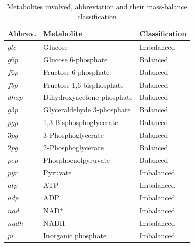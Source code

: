 \begin{table}[h]
\centering
\caption{Metabolites involved, abbreviation and  their mass-balance classification}
\label{tab: metabolites}
\begin{tabular}{lll}
\textbf{Abbrev.} & \textbf{Metabolite} & \textbf{Classification} \\
\hline
$glc$  & Glucose                    & Imbalanced \\
$g6p$  & Glucose 6-phosphate        & Balanced \\
$f6p$  & Fructose 6-phosphate       & Balanced \\
$fbp$  & Fructose 1,6-bisphosphate  & Balanced \\
$dhap$ & Dihydroxyacetone phosphate & Balanced \\
$g3p$  & Glyceraldehyde 3-phosphate & Balanced \\
$pgp$  & 1,3-Bisphosphoglycerate    & Balanced \\
$3pg$  & 3-Phosphoglycerate         & Balanced \\
$2pg$  & 2-Phosphoglycerate         & Balanced \\
$pep$  & Phosphoenolpyruvate        & Balanced \\
$pyr$  & Pyruvate                   & Imbalanced \\
$atp$  & ATP                        & Imbalanced \\
$adp$  & ADP                        & Imbalanced \\
$nad$  & NAD$^+$                    & Imbalanced \\
$nadh$ & NADH                       & Imbalanced \\
$pi$   & Inorganic phosphate        & Imbalanced \\
\end{tabular}
\end{table}




